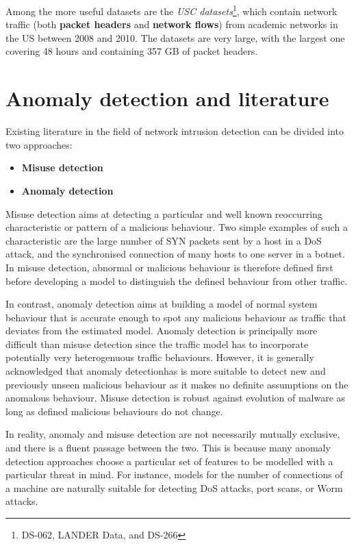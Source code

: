 \documentclass[a4paper,12pt,twoside]{report}
\begin{document}
Among the more useful datasets are the \textit{USC datasets}\footnote{DS-062, LANDER Data, and DS-266}, which contain network traffic (both \textbf{packet headers} and \textbf{network flows}) from academic networks in the US between 2008 and 2010. The datasets are very large, with the largest one covering 48 hours and containing 357 GB of packet headers. 


\chapter{Anomaly detection and literature}\label{Anomaly detection}

Existing literature in the field of network intrusion detection can be divided into two approaches: 

\begin{itemize}
\item \textbf{Misuse detection}
\item \textbf{Anomaly detection}
\end{itemize} 


Misuse detection aims at detecting a particular and well known reoccurring characteristic or pattern of a malicious behaviour. Two simple examples of such a characteristic are the large number of SYN packets sent by a host in a DoS attack, and the synchronised connection of many hosts to one server in a botnet. In misuse detection, abnormal or malicious behaviour is therefore defined first before developing a model to distinguish the defined behaviour from other traffic.

In contrast, anomaly detection aims at building a model of normal system behaviour that is accurate enough to spot any malicious behaviour as traffic that deviates from the estimated model. Anomaly detection is principally more difficult than misuse detection since the traffic model has to incorporate potentially very heterogenuous traffic behaviours. However, it is generally acknowledged that anomaly detectionhas is more suitable to detect new and previously unseen malicious behaviour as it makes no definite assumptions on the anomalous behaviour. Misuse detection is robust against evolution of malware as long as defined malicious behaviours do not change.

In reality, anomaly and misuse detection are not necessarily mutually exclusive, and there is a fluent passage between the two. This is because many anomaly detection approaches choose a particular set of features to be modelled with a particular threat in mind. For instance, models for the number of connections of a machine are naturally suitable for detecting DoS attacks, port scans, or Worm attacks. 
\end{document}

